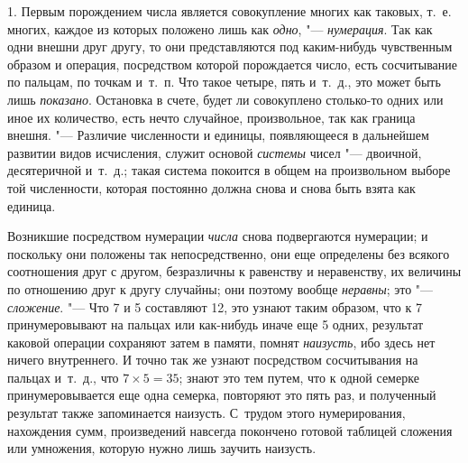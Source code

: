 1. Первым порождением числа является совокупление многих как таковых, т.~е.
многих, каждое из которых положено лишь как {\em одно},
"--- {\em нумерация}. Так как одни внешни друг другу, то
они представляются под каким-нибудь чувственным образом и операция,
посредством которой порождается число, есть сосчитывание по пальцам, по
точкам и~т.~п. Что такое четыре, пять и~т.~д., это может быть лишь
{\em показано}. Остановка в счете, будет ли совокуплено
столько-то одних или иное их количество, есть нечто случайное,
произвольное, так как граница внешня. "--- Различие численности и единицы,
появляющееся в дальнейшем развитии видов исчисления, служит основой
{\em системы} чисел "--- двоичной, десятеричной и~т.~д.;
такая система покоится в общем на произвольном выборе той численности,
которая постоянно должна снова и снова быть взята как единица.

Возникшие посредством нумерации {\em числа} снова
подвергаются нумерации; и поскольку они положены так непосредственно, они
еще определены без всякого соотношения друг с другом, безразличны к
равенству и неравенству, их величины по отношению друг к другу случайны;
они поэтому вообще {\em неравны}; это
"--- {\em сложение}. "--- Что 7 и 5 составляют 12, это узнают
таким образом, что к 7 принумеровывают на пальцах или как-нибудь иначе еще
5 одних, результат каковой операции сохраняют затем в памяти, помнят
{\em наизусть}, ибо здесь нет ничего внутреннего. И
точно так же узнают посредством сосчитывания на пальцах и~т.~д., что
$7 \times 5 = 35$; знают это тем путем, что к одной семерке
принумеровывается еще
одна семерка, повторяют это пять раз, и полученный результат также
запоминается наизусть. С~трудом этого нумерирования, нахождения сумм,
произведений навсегда покончено готовой таблицей сложения или умножения,
которую нужно лишь заучить наизусть.

